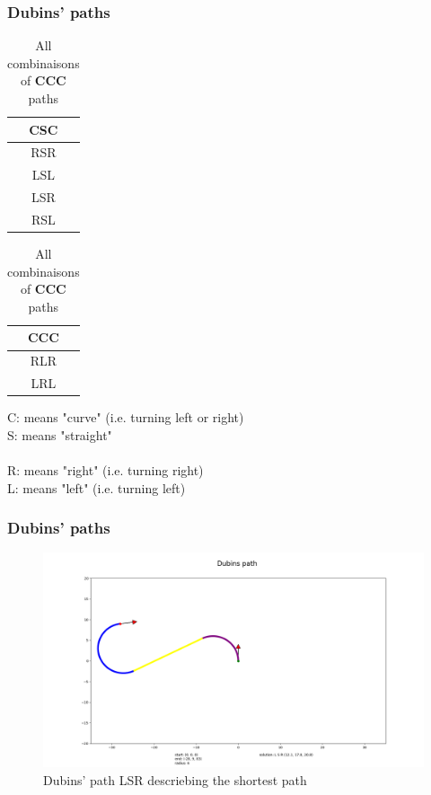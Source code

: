 \documentclass{beamer}
\begin{document}
\begin{frame}

\frametitle{Dubins' paths}

\vspace{0.5cm}

\begin{table}[h]
    \begin{subtable}[h]{0.45\textwidth}
        \centering
        \begin{tabular}{| c |}
        \textbf{CSC} \\
        \hline \hline
        RSR \\
        LSL \\
        LSR \\
        RSL
       \end{tabular}
				\caption{All combinaisons of \textbf{CSC} paths}
    \end{subtable}
    \hfill
        \begin{subtable}[h]{0.45\textwidth}
        \centering
        \begin{tabular}{| c |}
        \textbf{CCC} \\
        \hline \hline
        RLR \\
        LRL
       \end{tabular}
			\caption{All combinaisons of \textbf{CCC} paths}
    \end{subtable}
\end{table}

	\vspace*{1cm}

	C: means "curve" (i.e. turning left or right)\\
	S: means "straight"\\\\
	
	R: means "right" (i.e. turning right)\\
	L: means "left" (i.e. turning left)

\end{frame}

\begin{frame}

\frametitle{Dubins' paths}

\begin{figure}
\centering
  \centering
  \includegraphics[width=1.1\linewidth]{Illustrations/002.png}
  \caption{Dubins' path LSR descriebing the shortest path}
  \label{fig:sub1}
\end{figure}
\end{frame}
\end{document}
